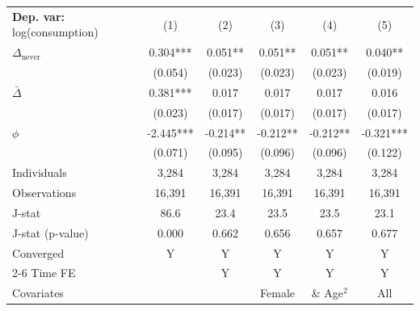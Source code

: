 \begin{tabular}{l ccccc} \toprule  \textbf{Dep. var:}  log(consumption) 
                    &\multicolumn{1}{c}{(1)}   &\multicolumn{1}{c}{(2)}   &\multicolumn{1}{c}{(3)}   &\multicolumn{1}{c}{(4)}   &\multicolumn{1}{c}{(5)}   \\

\addlinespace
$\Delta_{\text{never}}$&       0.304***&       0.051** &       0.051** &       0.051** &       0.040** \\
                    &     (0.054)   &     (0.023)   &     (0.023)   &     (0.023)   &     (0.019)   \\

\addlinespace
$\bar{\Delta}$      &       0.381***&       0.017   &       0.017   &       0.017   &       0.016   \\
                    &     (0.023)   &     (0.017)   &     (0.017)   &     (0.017)   &     (0.017)   \\

\addlinespace
$\phi$              &      -2.445***&      -0.214** &      -0.212** &      -0.212** &      -0.321***\\
                    &     (0.071)   &     (0.095)   &     (0.096)   &     (0.096)   &     (0.122)   \\
\addlinespace
Individuals         &       3,284   &       3,284   &       3,284   &       3,284   &       3,284   \\
Observations        &      16,391   &      16,391   &      16,391   &      16,391   &      16,391   \\
J-stat              &        86.6   &        23.4   &        23.5   &        23.5   &        23.1   \\
J-stat (p-value)    &       0.000   &       0.662   &       0.656   &       0.657   &       0.677   \\
Converged           &           Y   &           Y   &           Y   &           Y   &           Y   \\
\cmidrule{2-6} Time FE & & Y & Y & Y & Y \\ Covariates & & & Female & \& Age$^2$ & All \\ \bottomrule \end{tabular}
